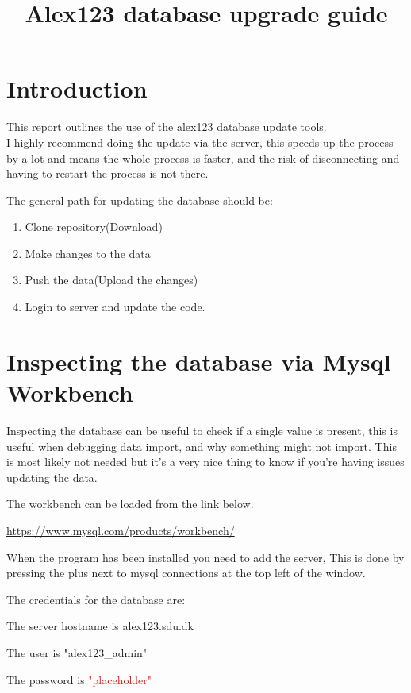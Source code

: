 \documentclass[a4paper,10pt,titlepage]{report}
\date{}
\title{Alex123 database upgrade guide}
\begin{document}
\section{Introduction}

This report outlines the use of the alex123 database update tools.
\\

I highly recommend doing the update via the server, this speeds up the process by a lot and means the whole process is faster, and the risk of disconnecting and having to restart the process is not there.



The general path for updating the database should be:

\begin{enumerate}
\item Clone repository(Download)
\item Make changes to the data
\item Push the data(Upload the changes)
\item Login to server and update the code.
\end{enumerate}	

\newpage
\section{Inspecting the database via Mysql Workbench}

Inspecting the database can be useful to check if a single value is present, this is useful when debugging data import, and why something might not import. This is most likely not needed but it's a very nice thing to know if you're having issues updating the data.


The workbench can be loaded from the link below.

\url{https://www.mysql.com/products/workbench/}

When the program has been installed you need to add the server, This is done by pressing the plus next to mysql connections at the top left of the window.

\vspace{5mm}

The credentials for the database are:

The server hostname is alex123.sdu.dk

The user is "alex123\_admin"

The password is \textcolor{red}{"placeholder"}
\vspace{5mm}
\end{document}
